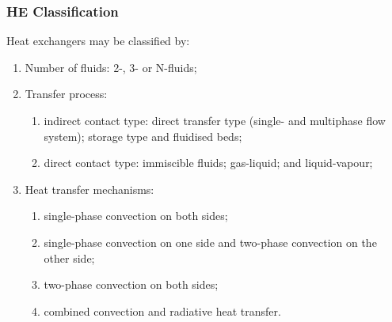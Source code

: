 \documentclass[10pt,compress,unknownkeysallowed]{beamer}
\begin{document}
\begin{frame}
 \frametitle{HE Classification}
    Heat exchangers may be classified by:
      \begin{enumerate}%
          \item<1-> Number of fluids: 2-, 3- or N-fluids;
          \item<2-> Transfer process:
             \begin{enumerate}
                 \item<2-> indirect contact type: direct transfer type (\ie single- and multiphase flow system); storage type and fluidised beds;
                 \item<2-> direct contact type: immiscible fluids; gas-liquid; and liquid-vapour;
             \end{enumerate}
          \item<3-> Heat transfer mechanisms:
             \begin{enumerate}
                 \item<3-> single-phase convection on both sides;  
                 \item<3-> single-phase convection on one side and two-phase convection on the other side; 
                 \item<3-> two-phase convection on both sides;
                 \item<3-> combined convection and radiative heat transfer.
             \end{enumerate}
   \end{enumerate}
\end{frame}
\end{document}
